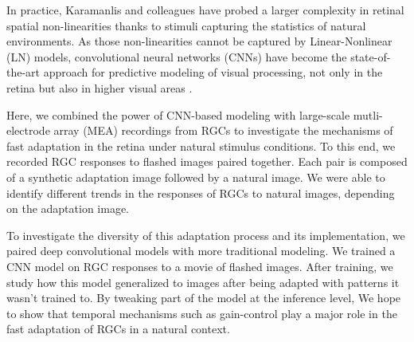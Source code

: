 In practice, Karamanlis and colleagues \citep{kim_nonlinear_2020} have
probed a larger complexity in retinal spatial non-linearities thanks to stimuli
capturing the statistics of natural environments.
As those non-linearities cannot be captured by Linear-Nonlinear (LN) models,
convolutional neural networks (CNNs) have become the state-of-the-art approach
for predictive modeling of visual processing, not only in the retina but also
in higher visual areas \citep{mcintosh_deep_2017}.

Here, we combined the power of CNN-based modeling with large-scale
mutli-electrode array (MEA) recordings from RGCs to investigate the mechanisms
of fast
adaptation in the retina under natural stimulus conditions. To this end, we
recorded RGC responses to flashed images paired together. Each pair is composed
of a synthetic adaptation image followed by a natural image. We were able to
identify different trends in the responses of RGCs to natural images, depending
on the adaptation image. %

To investigate the diversity of this adaptation process and its implementation,
we paired deep convolutional models with more traditional modeling. We trained
a CNN model on RGC responses to a movie of flashed images. After training, we
study how this model generalized to images after being adapted with
patterns it wasn't trained to. By tweaking part of the model at the inference
level, We hope to show that temporal mechanisms such as gain-control play a
major role in the fast adaptation of RGCs in a natural context.
